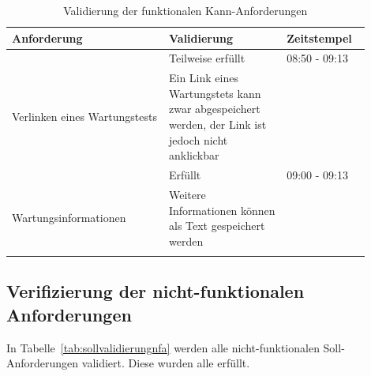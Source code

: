 \begin{longtable}{| P{0.4\linewidth} | P{0.3\linewidth} | P{0.2\linewidth} |} 
  \hline
  \textbf{Anforderung} & \textbf{Validierung} & \textbf{Zeitstempel}\\ [0.5ex] 
  \hline
  
   & Teilweise erfüllt & 08:50 - 09:13 \\
  Verlinken eines Wartungstests & Ein Link eines Wartungstets kann zwar abgespeichert werden, der Link ist jedoch nicht anklickbar & \\ [0.5ex] \hline

   & Erfüllt & 09:00 - 09:13 \\
  Wartungsinformationen & Weitere Informationen können als Text gespeichert werden & \\ [0.5ex] \hline

  \caption{Validierung der funktionalen Kann-Anforderungen}\label{tab:kannvalidierung}
\end{longtable}

\newpage

\subsection{Verifizierung der nicht-funktionalen Anforderungen}
In Tabelle~\ref{tab:sollvalidierungnfa} werden alle nicht-funktionalen Soll-Anforderungen
validiert. Diese wurden alle erfüllt.

